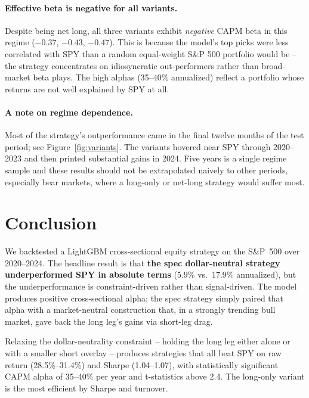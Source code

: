 \documentclass[11pt]{article}
\begin{document}
\paragraph{Effective beta is negative for all variants.} Despite being net long, all
three variants exhibit \emph{negative} CAPM beta in this regime
($-0.37$, $-0.43$, $-0.47$). This is because the model's top picks were less correlated
with SPY than a random equal-weight S\&P 500 portfolio would be -- the strategy
concentrates on idiosyncratic out-performers rather than broad-market beta plays. The
high alphas (35--40\% annualized) reflect a portfolio whose returns are not well
explained by SPY at all.

\paragraph{A note on regime dependence.} Most of the strategy's outperformance came in
the final twelve months of the test period; see Figure~\ref{fig:variants}. The variants
hovered near SPY through 2020--2023 and then printed substantial gains in 2024. Five
years is a single regime sample and these results should not be extrapolated naively to
other periods, especially bear markets, where a long-only or net-long strategy would
suffer most.

\section{Conclusion}
\label{sec:conclusion}
We backtested a LightGBM cross-sectional equity strategy on the S\&P~500 over 2020--2024.
The headline result is that \textbf{the spec dollar-neutral strategy underperformed SPY
in absolute terms} (5.9\% vs.\ 17.9\% annualized), but the underperformance is
constraint-driven rather than signal-driven. The model produces positive cross-sectional
alpha; the spec strategy simply paired that alpha with a market-neutral construction
that, in a strongly trending bull market, gave back the long leg's gains via short-leg
drag.

Relaxing the dollar-neutrality constraint -- holding the long leg either alone or with
a smaller short overlay -- produces strategies that all beat SPY on raw return
(28.5\%--31.4\%) and Sharpe (1.04--1.07), with statistically significant CAPM alpha
of 35--40\% per year and t-statistics above 2.4. The long-only variant is the most
efficient by Sharpe and turnover.
\end{document}
